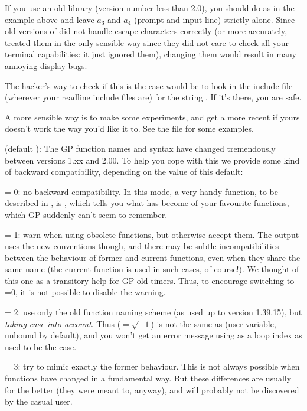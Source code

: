 If you use an old  library (version number less than 2.0),
you should do as in the example above and leave $a_3$ and $a_4$ (prompt
and input line) strictly alone. Since old versions of  did
not handle escape characters correctly (or more accurately, treated them
in the only sensible way since they did not care to check all your terminal
capabilities: it just ignored them), changing them would result in many
annoying display bugs.

The hacker's way to check if this is the case would be to look in the
 include file (wherever your readline include files are) for
the string . If it's there, you are safe.

A more sensible way is to make some experiments, and get a more recent
 if yours doesn't work the way you'd like it to. See the file
 for some examples.

 (default ): The GP function names and syntax
have changed tremendously between versions 1.xx and 2.00. To help you cope
with this we provide some kind of backward compatibility, depending on the
value of this default:

\quad {} = 0: no backward compatibility. In this mode, a very
handy function, to be described in , is ,
which tells you what has become of your favourite functions, which GP
suddenly can't seem to remember.

\quad {} = 1: warn when using obsolete functions, but
otherwise accept them. The output uses the new conventions though, and
there may be subtle incompatibilities between the behaviour of former and
current functions, even when they share the same name (the current function
is used in such cases, of course!). We thought of this one as a transitory
help for GP old-timers. Thus, to encourage switching to =0,
it is not possible to disable the warning.

\quad {} = 2: use only the old function naming scheme (as
used up to version 1.39.15), but {\it taking case into account}. Thus
 (${}=\sqrt{-1}$) is not the same as  (user variable, unbound
by default), and you won't get an error message using  as a loop
index as used to be the case.

\quad {} = 3: try to mimic exactly the former behaviour. This
is not always possible when functions have changed in a fundamental way.
But these differences are usually for the better (they were meant to,
anyway), and will probably not be discovered by the casual user.


